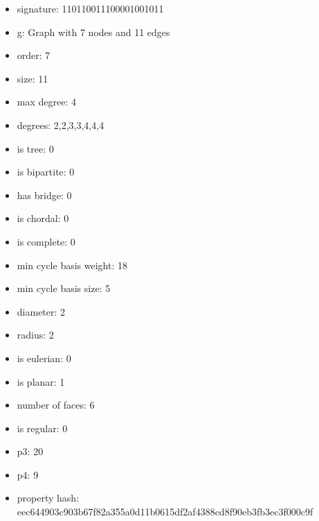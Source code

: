 \begin{itemize}
\item signature: 110110011100001001011
\item g: Graph with 7 nodes and 11 edges
\item order: 7
\item size: 11
\item max degree: 4
\item degrees: 2,2,3,3,4,4,4
\item is tree: 0
\item is bipartite: 0
\item has bridge: 0
\item is chordal: 0
\item is complete: 0
\item min cycle basis weight: 18
\item min cycle basis size: 5
\item diameter: 2
\item radius: 2
\item is eulerian: 0
\item is planar: 1
\item number of faces: 6
\item is regular: 0
\item p3: 20
\item p4: 9
\item property hash: eec644903c903b67f82a355a0d11b0615df2af4388cd8f90eb3fb3ec3f000c9f
\end{itemize}
\newpage
\begin{figure}
\end{figure}
